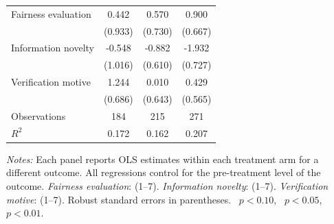 \begin{table}[htbp]
\begin{tabular}{l*{3}{c}}
Fairness evaluation &       0.442         &       0.570         &       0.900         \\
                    &     (0.933)         &     (0.730)         &     (0.667)         \\
\addlinespace
Information novelty &      -0.548         &      -0.882         &      -1.932\sym{***}\\
                    &     (1.016)         &     (0.610)         &     (0.727)         \\
\addlinespace
Verification motive &       1.244\sym{*}  &       0.010         &       0.429         \\
                    &     (0.686)         &     (0.643)         &     (0.565)         \\
\midrule
Observations        &         184         &         215         &         271         \\
$R^2$               &       0.172         &       0.162         &       0.207         \\
\bottomrule
\end{tabular}
\par\vspace{4pt}
\begin{minipage}{\textwidth}
\footnotesize \textit{Notes:} Each panel reports OLS estimates within each treatment arm for a different outcome. All regressions control for the pre-treatment level of the outcome. \textit{Fairness evaluation}:  (1--7). \textit{Information novelty}:  (1--7). \textit{Verification motive}:  (1--7). Robust standard errors in parentheses. \sym{*}~$p<0.10$, \sym{**}~$p<0.05$, \sym{***}~$p<0.01$.
\end{minipage}
\end{table}
